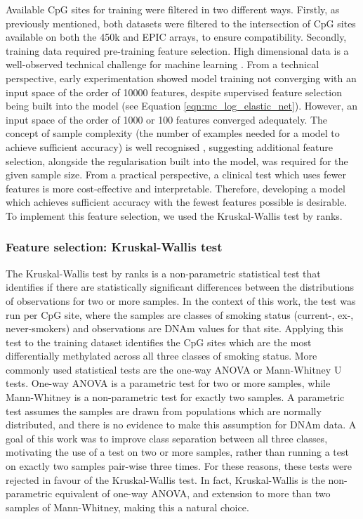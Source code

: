 \documentclass[draft]{article}
\begin{document}
Available CpG sites for training were filtered in two different ways. Firstly, as previously mentioned, both datasets were filtered to the intersection of CpG sites available on both the 450k and EPIC arrays, to ensure compatibility. Secondly, training data required pre-training feature selection. High dimensional data is a well-observed technical challenge for machine learning \cite{cai2018feature}. From a technical perspective, early experimentation showed model training not converging with an input space of the order of \num{10000} features, despite supervised feature selection being built into the model (see Equation \ref{eqn:mc_log_elastic_net}). However, an input space of the order of \num{1000} or \num{100} features converged adequately. The concept of sample complexity (the number of examples needed for a model to achieve sufficient accuracy) is well recognised \cite{blum1997selection}, suggesting additional feature selection, alongside the regularisation built into the model, was required for the given sample size. From a practical perspective, a clinical test which uses fewer features is more cost-effective and interpretable. Therefore, developing a model which achieves sufficient accuracy with the fewest features possible is desirable. To implement this feature selection, we used the Kruskal-Wallis test by ranks.

\subsubsection{Feature selection: Kruskal-Wallis test} \label{sec:feature-selection}
The Kruskal-Wallis test by ranks \cite{Kruskal1952UseOR} is a non-parametric statistical test that identifies if there are statistically significant differences between the distributions of observations for two or more samples. In the context of this work, the test was run per CpG site, where the samples are classes of smoking status (current-, ex-, never-smokers) and observations are DNAm values for that site. Applying this test to the training dataset identifies the CpG sites which are the most differentially methylated across all three classes of smoking status. More commonly used statistical tests are the one-way ANOVA \cite{fisher1921probable} or Mann-Whitney U \cite{mann1947test} tests. One-way ANOVA is a parametric test for two or more samples, while Mann-Whitney is a non-parametric test for exactly two samples. A parametric test assumes the samples are drawn from populations which are normally distributed, and there is no evidence to make this assumption for DNAm data. A goal of this work was to improve class separation between all three classes, motivating the use of a test on two or more samples, rather than running a test on exactly two samples pair-wise three times. For these reasons, these tests were rejected in favour of the Kruskal-Wallis test. In fact, Kruskal-Wallis is the non-parametric equivalent of one-way ANOVA, and extension to more than two samples of Mann-Whitney, making this a natural choice.
\end{document}
